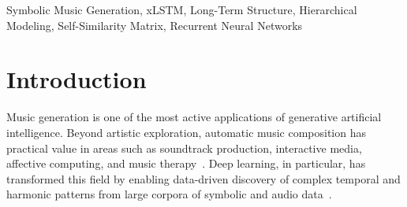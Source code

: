 \documentclass[conference]{IEEEtran}
\newcommand{\TODO}[1]{\textcolor{red}{\textbf{[TODO: #1]}}}
\begin{document}
\begin{abstract}
Deep learning has significantly advanced symbolic music generation,yet maintaining long-term structural coherence—including thematic repetition, phrase symmetry, and sectional contrast—remains a core open challenge. Existing approaches face a fundamental trade-off:
explicit hierarchical models achieve structural consistency but rely on rigid, predefined segmentation, while standard autoregressive models are flexible but tend to lose global coherence over long sequences. This work investigates the Extended Long Short-Term Memory (xLSTM) architecture as an approach for \emph{implicit} multi-timescale modeling in symbolic music generation. We train xLSTM models on the Lakh MIDI Dataset (LMD) using the REMIGEN2 token representation and evaluate their performance across multiple context lengths. We further evaluate structural coherence using bar-level self-similarity matrices (SSMs) and motif recurrence metrics, and complement these with human listening evaluations. \TODO{Update with final findings after all experiments complete.}
\end{abstract}

\begin{IEEEkeywords}
Symbolic Music Generation, xLSTM, Long-Term Structure, Hierarchical Modeling, Self-Similarity Matrix, Recurrent Neural Networks
\end{IEEEkeywords}

\section{Introduction}
\label{sec:intro}

Music generation is one of the most active applications of generative artificial intelligence. Beyond artistic exploration, automatic music composition has practical value in areas such as soundtrack production, interactive media, affective computing, and music therapy~\cite{dash2024}.
Deep learning, in particular, has transformed this field by enabling data-driven discovery of complex temporal and harmonic patterns from large corpora of symbolic and audio data~\cite{mitra2025, le2025}.
\end{document}
